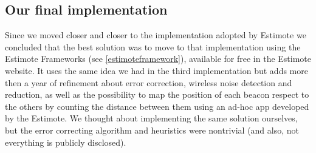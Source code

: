 \subsection{Our final implementation}
Since we moved closer and closer to the implementation adopted by Estimote we concluded that the best solution was to move to that implementation using the Estimote Frameworks (see \ref{estimoteframework}), available for free in the Estimote website. It uses the same idea we had in the third implementation but adds more then a year of refinement about error correction, wireless noise detection and reduction, as well as the possibility to map the position of each beacon respect to the others by counting the distance between them using an ad-hoc app developed by the Estimote. We thought about implementing the same solution ourselves, but the error correcting algorithm and heuristics were nontrivial (and also, not everything is publicly disclosed).